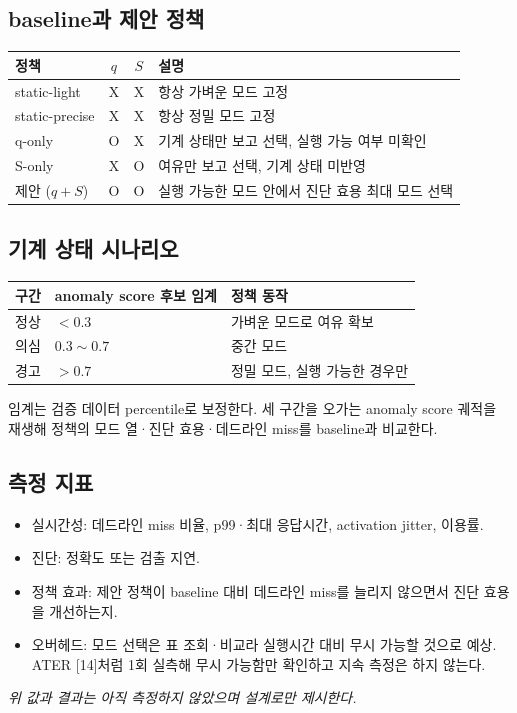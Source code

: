 \documentclass[10pt]{article}
\begin{document}
\subsection{baseline과 제안 정책}
\begin{center}\footnotesize
\begin{tabular}{@{}lccL{6.5cm}@{}}
\toprule
정책 & $q$ & $S$ & 설명 \\ \midrule
static-light & X & X & 항상 가벼운 모드 고정 \\
static-precise & X & X & 항상 정밀 모드 고정 \\
q-only & O & X & 기계 상태만 보고 선택, 실행 가능 여부 미확인 \\
S-only & X & O & 여유만 보고 선택, 기계 상태 미반영 \\
제안 ($q+S$) & O & O & 실행 가능한 모드 안에서 진단 효용 최대 모드 선택 \\
\bottomrule
\end{tabular}
\end{center}

\subsection{기계 상태 시나리오}
\begin{center}\footnotesize
\begin{tabular}{@{}lll@{}}
\toprule
구간 & anomaly score 후보 임계 & 정책 동작 \\ \midrule
정상 & $<0.3$ & 가벼운 모드로 여유 확보 \\
의심 & $0.3\sim0.7$ & 중간 모드 \\
경고 & $>0.7$ & 정밀 모드, 실행 가능한 경우만 \\
\bottomrule
\end{tabular}
\end{center}
\noindent 임계는 검증 데이터 percentile로 보정한다. 세 구간을 오가는 anomaly score 궤적을 재생해 정책의 모드 열·진단 효용·데드라인 miss를 baseline과 비교한다.

\subsection{측정 지표}
\begin{itemize}
\item 실시간성: 데드라인 miss 비율, p99·최대 응답시간, activation jitter, 이용률.
\item 진단: 정확도 또는 검출 지연.
\item 정책 효과: 제안 정책이 baseline 대비 데드라인 miss를 늘리지 않으면서 진단 효용을 개선하는지.
\item 오버헤드: 모드 선택은 표 조회·비교라 실행시간 대비 무시 가능할 것으로 예상. ATER [14]처럼 1회 실측해 무시 가능함만 확인하고 지속 측정은 하지 않는다.
\end{itemize}
\noindent\emph{위 값과 결과는 아직 측정하지 않았으며 설계로만 제시한다.}
\end{document}
